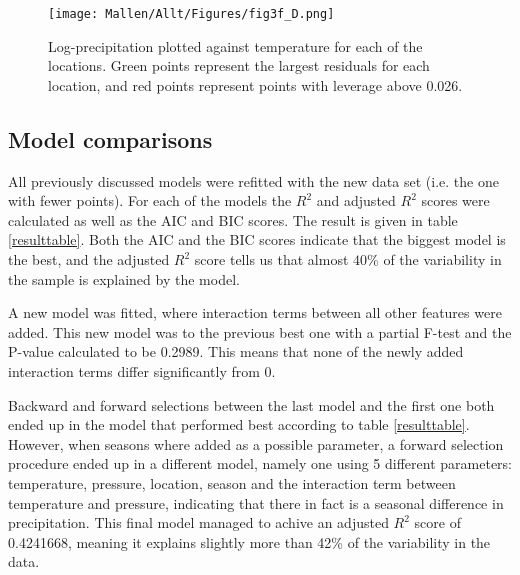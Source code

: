 \begin{figure}[H]
\centering
	\texttt{[image: Mallen/Allt/Figures/fig3f\_D.png]}    		\caption{Log-precipitation plotted against temperature for each of the locations. Green points represent the largest residuals for each location, and red points represent points with leverage above 0.026.}
    \label{fig3f_D}
\end{figure}

\subsection{Model comparisons}

All previously discussed models were refitted with the new data set (i.e. the one with fewer points). For each of the models the $R^2$ and adjusted $R^2$ scores were calculated as well as the AIC and BIC scores. The result is given in table \ref{resulttable}. Both the AIC and the BIC scores indicate that the biggest model is the best, and the adjusted $R^2$ score tells us that almost $40\%$ of the variability in the sample is explained by the model. 

A new model was fitted, where interaction terms between all other features were added. This new model was to the previous best one with a partial F-test and the P-value calculated to be 0.2989. This means that none of the newly added interaction terms differ significantly from 0.

Backward and forward selections between the last model and the first one both ended up in the model that performed best according to table \ref{resulttable}. However, when seasons where added as a possible parameter, a forward selection procedure ended up in a different model, namely one using 5 different parameters: temperature, pressure, location, season and the interaction term between temperature and pressure, indicating that there in fact is a seasonal difference in precipitation. This final model managed to achive an adjusted $R^2$ score of 0.4241668, meaning it explains slightly more than 42\% of the variability in the data. 